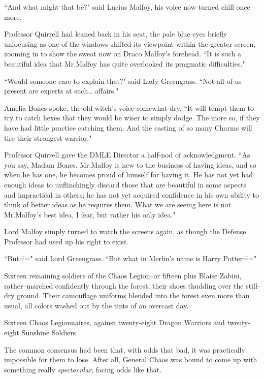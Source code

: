 ``And what might that be?" said Lucius Malfoy, his voice now turned chill once more.

Professor Quirrell had leaned back in his seat, the pale blue eyes briefly unfocusing as one of the windows shifted its viewpoint within the greater screen, zooming in to show the sweat now on Draco Malfoy's forehead. ``It is such a beautiful idea that Mr.\?Malfoy has quite overlooked its pragmatic difficulties."

``Would someone care to explain that?" said Lady Greengrass. ``Not all of us present are experts at such{\ldots} affairs."

Amelia Bones spoke, the old witch's voice somewhat dry. ``It will tempt them to try to catch hexes that they would be wiser to simply dodge. The more so, if they have had little practice catching them. And the casting of so many Charms will tire their strongest warrior."

Professor Quirrell gave the DMLE Director a half-nod of acknowledgment. ``As you say, Madam Bones. Mr.\?Malfoy is new to the business of having ideas, and so when he has one, he becomes proud of himself for having it. He has not yet had enough ideas to unflinchingly discard those that are beautiful in some aspects and impractical in others; he has not yet acquired confidence in his own ability to think of better ideas as he requires them. What we are seeing here is not Mr.\?Malfoy's best idea, I fear, but rather his only idea."

Lord Malfoy simply turned to watch the screens again, as though the Defense Professor had used up his right to exist.

``But\===" said Lord Greengrass. ``But what in Merlin's name is Harry Potter\==="

\later

Sixteen remaining soldiers of the Chaos Legion\---or fifteen plus Blaise Zabini, rather\---marched confidently through the forest, their shoes thudding over the still-dry ground. Their camouflage uniforms blended into the forest even more than usual, all colors washed out by the tints of an overcast day.

Sixteen Chaos Legionnaires, against twenty-eight Dragon Warriors and twenty-eight Sunshine Soldiers.

The common consensus had been that, with odds that bad, it was practically impossible for them to lose. After all, General Chaos was bound to come up with something really \emph{spectacular}, facing odds like that.

